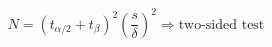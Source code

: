 

\[
N = (t_{\alpha/2} + t_{\beta})^2 \left( \frac{s}{\delta} \right)^2 \Rightarrow \mbox{two-sided test}
\]


